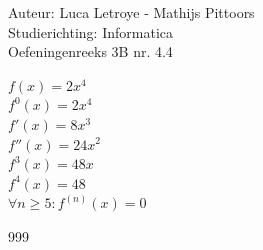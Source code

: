 \documentclass[a4paper]{article}
\begin{document}
  
\noindent \large Auteur: Luca Letroye -  Mathijs Pittoors \\
\noindent \large Studierichting: Informatica\\
\noindent \large Oefeningenreeks 3B nr. 4.4\\

\medskip

\normalsize

$f(x) = 2x^4$\\

$f^0(x) = 2x^4$\\

$f'(x) = 8x^3$\\

$f''(x) = 24x^2$\\

$f^3(x) = 48x$\\

$f^4(x) = 48$\\

$\forall n \ge 5 : f^{(n)}(x) = 0$

\begin{thebibliography}{999}
\end{thebibliography}
\end{document}
